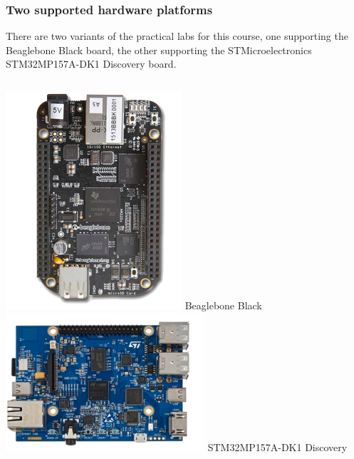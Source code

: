 \begin{frame}
\frametitle{Two supported hardware platforms}
  There are two variants of the practical labs for this course, one
  supporting the Beaglebone Black board, the other supporting the
  STMicroelectronics STM32MP157A-DK1 Discovery board.
  \vfill
  \begin{columns}
    \includegraphics[height=0.5\textheight]{slides/beagleboneblack-board/beagleboneblack.png}
    \newline
    Beaglebone Black
    \includegraphics[height=0.5\textheight]{slides/discovery-board-dk1/discovery-board-dk1.png}
    \newline
    STM32MP157A-DK1 Discovery
  \end{columns}
\end{frame}
